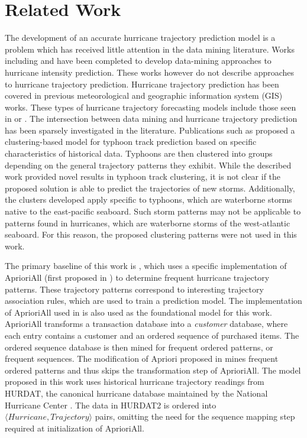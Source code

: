 \documentclass[12pt,conference]{IEEEtran}
\begin{document}
\section{Related Work}

The development of an accurate hurricane trajectory prediction model is a problem which has received little attention in the data mining literature. Works including \cite{hurricane-intensity-1} and \cite{hurricane-intensity-2} have been completed to develop data-mining approaches to hurricane intensity prediction. These works however do not describe approaches to hurricane trajectory prediction. Hurricane trajectory prediction has been covered in previous meteorological and geographic information system (GIS) works. These types of hurricane trajectory forecasting models include those seen in \cite{hurricane-forecasting-1} or \cite{hurricane-forecasting-2}. The intersection between data mining and hurricane trajectory prediction has been sparsely investigated in the literature. Publications such as \cite{typhoon-clustering} proposed a clustering-based model for typhoon track prediction based on specific characteristics of historical data. Typhoons are then clustered into groups depending on the general trajectory patterns they exhibit. While the described work provided novel results in typhoon track clustering, it is not clear if the proposed solution is able to predict the trajectories of new storms. Additionally, the clusters developed apply specific to typhoons, which are waterborne storms native to the east-pacific seaboard. Such storm patterns may not be applicable to patterns found in hurricanes, which are waterborne storms of the west-atlantic seaboard. For this reason, the proposed clustering patterns were not used in this work.

The primary baseline of this work is \cite{major-hurricane-model}, which uses a specific implementation of AprioriAll (first proposed in \cite{AprioriAll-original}) to determine frequent hurricane trajectory patterns. These trajectory patterns correspond to interesting trajectory association rules, which are used to train a prediction model. The implementation of AprioriAll used in \cite{major-hurricane-model} is also used as the foundational model for this work. AprioriAll transforms a transaction database into a \textit{customer} database, where each entry contains a customer and an ordered sequence of purchased items. The ordered sequence database is then mined for frequent ordered patterns, or frequent sequences. The modification of Apriori proposed in \cite{major-hurricane-model} mines frequent ordered patterns and thus skips the transformation step of AprioriAll. The model proposed in this work uses historical hurricane trajectory readings from HURDAT, the canonical hurricane database maintained by the National Hurricane Center \cite{HURDAT2-original}. The data in HURDAT2 is ordered into $\langle Hurricane, Trajectory \rangle$ pairs, omitting the need for the sequence mapping step required at initialization of AprioriAll. 
\end{document}
